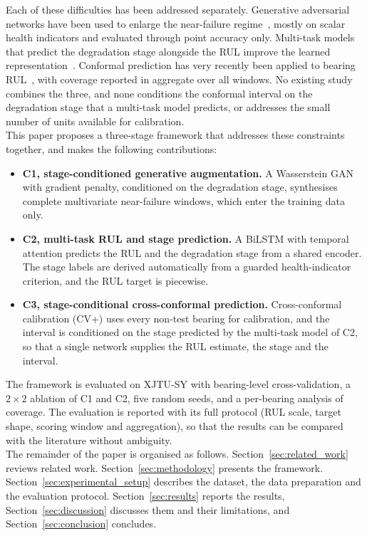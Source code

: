 Each of these difficulties has been addressed separately. Generative
adversarial networks have been used to enlarge the near-failure
regime~\cite{9486650, lu_joint_2022}, mostly on scalar health
indicators and evaluated through point accuracy only. Multi-task
models that predict the degradation stage alongside the RUL improve the
learned representation~\cite{8709822}. Conformal prediction has very
recently been applied to bearing RUL~\cite{wang_uncertainty-aware_2026,
11373138}, with coverage reported in aggregate over all windows. No
existing study combines the three, and none conditions the conformal
interval on the degradation stage that a multi-task model predicts, or
addresses the small number of units available for calibration.\\

This paper proposes a three-stage framework that addresses these
constraints together, and makes the following contributions:
\begin{itemize}
  \item \textbf{C1, stage-conditioned generative augmentation.} A
  Wasserstein GAN with gradient penalty, conditioned on the degradation
  stage, synthesises complete multivariate near-failure windows, which
  enter the training data only.
  \item \textbf{C2, multi-task RUL and stage prediction.} A BiLSTM with
  temporal attention predicts the RUL and the degradation stage from a
  shared encoder. The stage labels are derived automatically from a
  guarded health-indicator criterion, and the RUL target is piecewise.
  \item \textbf{C3, stage-conditional cross-conformal prediction.}
  Cross-conformal calibration (CV+) uses every non-test bearing for
  calibration, and the interval is conditioned on the stage predicted
  by the multi-task model of C2, so that a single network supplies the
  RUL estimate, the stage and the interval.
\end{itemize}
The framework is evaluated on XJTU-SY with bearing-level
cross-validation, a $2 \times 2$ ablation of C1 and C2, five random
seeds, and a per-bearing analysis of coverage. The evaluation is
reported with its full protocol (RUL scale, target shape, scoring
window and aggregation), so that the results can be compared with the
literature without ambiguity.\\

The remainder of the paper is organised as follows.
Section~\ref{sec:related_work} reviews related work.
Section~\ref{sec:methodology} presents the framework.
Section~\ref{sec:experimental_setup} describes the dataset, the data
preparation and the evaluation protocol. Section~\ref{sec:results}
reports the results, Section~\ref{sec:discussion} discusses them and
their limitations, and Section~\ref{sec:conclusion} concludes.

